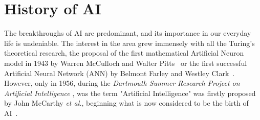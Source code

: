 \documentclass[class=report, crop=false, a4paper, 12pt]{standalone}
\begin{document}
\section{History of AI}



\par The breakthroughs of AI are predominant, and its importance in our everyday life is undeniable. The interest in the area grew immensely with all the Turing's theoretical research, the proposal of the first mathematical Artificial Neuron model in 1943 by Warren McCulloch and Walter Pitts~\autocite{mccullochLOGICALCALCULUSIDEAS} or the first successful Artificial Neural Network (ANN) by Belmont Farley and Westley Clark~\autocite{farleySimulationSelforganizingSystems1954}. However, only in 1956, during the \textit{Dartmouth Summer Research Project on Artificial Intelligence} \autocite{mccarthyPROPOSALDARTMOUTHSUMMER}, was the term "Artificial Intelligence" was firstly proposed by John McCarthy \textit{et al.}, beginning what is now considered to be the birth of AI~\autocite{zhangStudyArtificialIntelligence2021}.  
\end{document}
